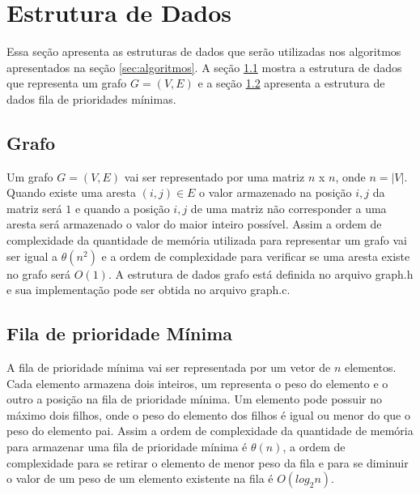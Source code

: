 \section{Estrutura de Dados}\label{sec:estrutura_dados} 
Essa seção apresenta as estruturas de dados que serão utilizadas nos algoritmos apresentados
na seção \ref{sec:algoritmos}. A seção \ref{sec:grafo} mostra a estrutura de dados que representa
um grafo $G =(V, E)$ e a seção \ref{sec:queue_min} apresenta a estrutura de dados fila de prioridades
mínimas.

\subsection{Grafo}\label{sec:grafo} 

Um grafo $G = (V, E)$ vai ser representado por uma matriz $n$ x $n$, onde $n = |V|$. Quando existe uma 
aresta $(i, j) \in E$ o valor armazenado na posição $i, j$ da matriz será $1$ e quando a posição 
$i, j$ de uma matriz não corresponder a uma aresta será armazenado o valor do maior inteiro possível.
Assim a ordem de complexidade da quantidade de memória utilizada para representar um grafo vai ser igual a $\theta(n ^ 2)$ e 
a ordem de complexidade para verificar se uma aresta existe no grafo será $O(1)$. A estrutura de dados grafo está
definida no arquivo graph.h e sua implementação pode ser obtida no arquivo graph.c.

\subsection{Fila de prioridade Mínima}\label{sec:queue_min}
A fila de prioridade mínima vai ser representada por um vetor de $n$ elementos. Cada elemento armazena dois inteiros, um
representa o peso do elemento e o outro a posição na fila de prioridade mínima. Um elemento pode possuir no máximo dois filhos, onde
o peso do elemento dos filhos é igual ou menor do que o peso do elemento pai. Assim a ordem de complexidade da quantidade
de memória para armazenar uma fila de prioridade mínima é $\theta(n)$, a ordem de complexidade para se retirar o elemento de menor
peso da fila e para se diminuir o valor de um peso de um elemento existente na fila é $O(log_2 n)$.
